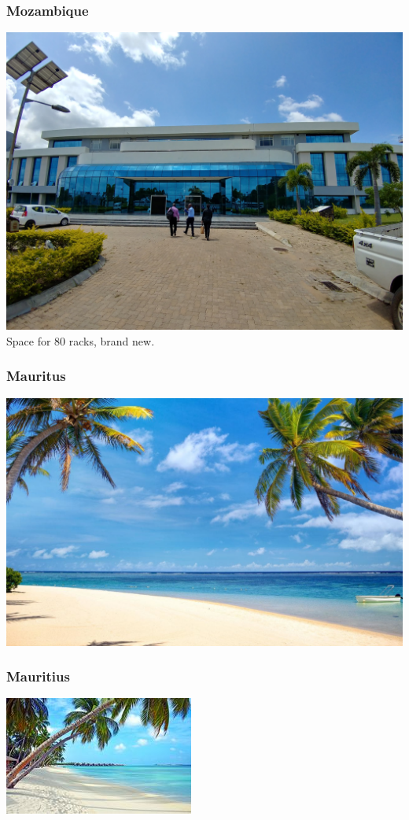 \documentclass{beamer}
\begin{document}
\begin{frame}
    \frametitle{Mozambique}
    \includegraphics[scale=0.1]{MozambiqueDataCentre.jpg}
    Space for 80 racks, brand new.
\end{frame}
\begin{frame}
    \frametitle{Mauritus}
    \includegraphics[scale=0.25]{Mauritius-Beaches-Tropical-beach-xlarge.jpg}
\end{frame}
\begin{frame}
    \frametitle{Mauritius}
    \includegraphics[scale=1.5]{Mauritius-Beaches2.jpg}
\end{frame}
\end{document}
